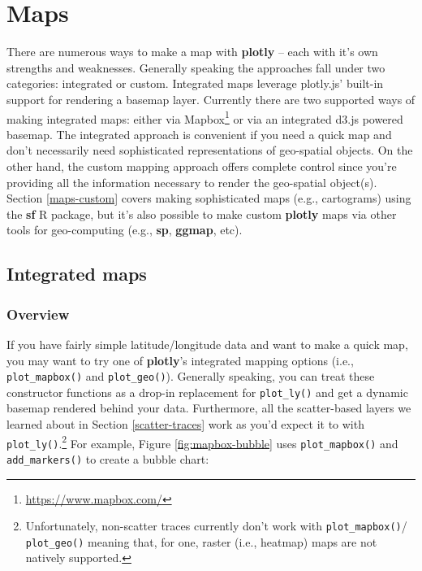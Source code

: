\documentclass[
  12pt,
]{krantz}
\renewcommand{\href}[2]{#2\footnote{\url{#1}}}
\begin{document}
\hypertarget{maps}{%
\chapter{Maps}\label{maps}}

There are numerous ways to make a map with \textbf{plotly} -- each with it's own strengths and weaknesses. Generally speaking the approaches fall under two categories: integrated or custom. Integrated maps leverage plotly.js' built-in support for rendering a basemap layer. Currently there are two supported ways of making integrated maps: either via \href{https://www.mapbox.com/}{Mapbox} or via an integrated d3.js powered basemap. The integrated approach is convenient if you need a quick map and don't necessarily need sophisticated representations of geo-spatial objects. On the other hand, the custom mapping approach offers complete control since you're providing all the information necessary to render the geo-spatial object(s). Section \ref{maps-custom} covers making sophisticated maps (e.g., cartograms) using the \textbf{sf} R package, but it's also possible to make custom \textbf{plotly} maps via other tools for geo-computing (e.g., \textbf{sp}, \textbf{ggmap}, etc).

\hypertarget{maps-integrated}{%
\section{Integrated maps}\label{maps-integrated}}

\hypertarget{overview-1}{%
\subsection{Overview}\label{overview-1}}

If you have fairly simple latitude/longitude data and want to make a quick map, you may want to try one of \textbf{plotly}'s integrated mapping options (i.e., \texttt{plot\_mapbox()} and \texttt{plot\_geo()}). Generally speaking, you can treat these constructor functions as a drop-in replacement for \texttt{plot\_ly()} and get a dynamic basemap rendered behind your data. Furthermore, all the scatter-based layers we learned about in Section \ref{scatter-traces} work as you'd expect it to with \texttt{plot\_ly()}.\footnote{Unfortunately, non-scatter traces currently don't work with \texttt{plot\_mapbox()}/ \texttt{plot\_geo()} meaning that, for one, raster (i.e., heatmap) maps are not natively supported.} For example, Figure \ref{fig:mapbox-bubble} uses \texttt{plot\_mapbox()} and \texttt{add\_markers()} to create a bubble chart:
\end{document}
